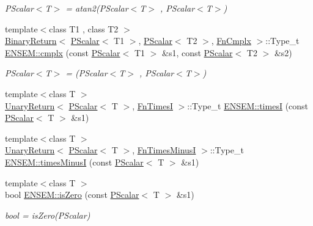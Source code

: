 \begin{DoxyCompactItemize}
\begin{DoxyCompactList}\small\item\em P\+Scalar$<$\+T$>$ = atan2(\+P\+Scalar$<$\+T$>$ , P\+Scalar$<$\+T$>$) \end{DoxyCompactList}\item 
{\footnotesize template$<$class T1 , class T2 $>$ }\\\mbox{\hyperlink{structENSEM_1_1BinaryReturn}{Binary\+Return}}$<$ \mbox{\hyperlink{classENSEM_1_1PScalar}{P\+Scalar}}$<$ T1 $>$, \mbox{\hyperlink{classENSEM_1_1PScalar}{P\+Scalar}}$<$ T2 $>$, \mbox{\hyperlink{structENSEM_1_1FnCmplx}{Fn\+Cmplx}} $>$\+::Type\+\_\+t \mbox{\hyperlink{group__primscalar_ga72cf1623c0ae655c15db12ad096194dc}{E\+N\+S\+E\+M\+::cmplx}} (const \mbox{\hyperlink{classENSEM_1_1PScalar}{P\+Scalar}}$<$ T1 $>$ \&s1, const \mbox{\hyperlink{classENSEM_1_1PScalar}{P\+Scalar}}$<$ T2 $>$ \&s2)
\begin{DoxyCompactList}\small\item\em P\+Scalar$<$\+T$>$ = (P\+Scalar$<$\+T$>$ , P\+Scalar$<$\+T$>$) \end{DoxyCompactList}\item 
{\footnotesize template$<$class T $>$ }\\\mbox{\hyperlink{structENSEM_1_1UnaryReturn}{Unary\+Return}}$<$ \mbox{\hyperlink{classENSEM_1_1PScalar}{P\+Scalar}}$<$ T $>$, \mbox{\hyperlink{structENSEM_1_1FnTimesI}{Fn\+TimesI}} $>$\+::Type\+\_\+t \mbox{\hyperlink{group__primscalar_ga70f6abe538ba4ee394447d572f919fc0}{E\+N\+S\+E\+M\+::timesI}} (const \mbox{\hyperlink{classENSEM_1_1PScalar}{P\+Scalar}}$<$ T $>$ \&s1)
\item 
{\footnotesize template$<$class T $>$ }\\\mbox{\hyperlink{structENSEM_1_1UnaryReturn}{Unary\+Return}}$<$ \mbox{\hyperlink{classENSEM_1_1PScalar}{P\+Scalar}}$<$ T $>$, \mbox{\hyperlink{structENSEM_1_1FnTimesMinusI}{Fn\+Times\+MinusI}} $>$\+::Type\+\_\+t \mbox{\hyperlink{group__primscalar_gabd11ad8f843bcbe3cfbf91ad061f864a}{E\+N\+S\+E\+M\+::times\+MinusI}} (const \mbox{\hyperlink{classENSEM_1_1PScalar}{P\+Scalar}}$<$ T $>$ \&s1)
\item 
{\footnotesize template$<$class T $>$ }\\bool \mbox{\hyperlink{group__primscalar_gab10f703e7498f1638c401a92ca8bc947}{E\+N\+S\+E\+M\+::is\+Zero}} (const \mbox{\hyperlink{classENSEM_1_1PScalar}{P\+Scalar}}$<$ T $>$ \&s1)
\begin{DoxyCompactList}\small\item\em bool = is\+Zero(\+P\+Scalar) \end{DoxyCompactList}\item 

\end{DoxyCompactItemize}
